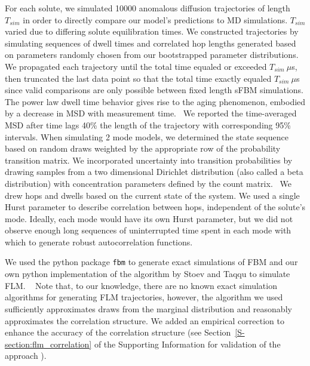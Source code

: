 \documentclass{article}
\begin{document}
  For each solute, we simulated 10000 anomalous diffusion trajectories of length $T_{sim}$ in
  order to directly compare our model's predictions to MD simulations. $T_{sim}$ varied due to
  differing solute equilibration times. We constructed trajectories by simulating 
  sequences of dwell times and correlated hop lengths generated based on
  parameters randomly chosen from our bootstrapped parameter distributions. We 
  propagated each trajectory until the total time equaled or exceeded $T_{sim}~ \mu$s, then
  truncated the last data point so that the total time exactly equaled $T_{sim}~ \mu$s since
  valid comparisons are only possible between fixed length sFBM simulations. The
  power law dwell time behavior gives rise to the aging phenomenon, embodied by a 
  decrease in MSD with measurement time.~\cite{neusius_subdiffusion_2008,metzler_anomalous_2014}
  We reported the time-averaged MSD after time lags 40\% the length of the trajectory
  with corresponding 95\% intervals.
  When simulating 2 mode models, we determined the state sequence based on random 
  draws weighted by the appropriate row of the probability transition matrix. We 
  incorporated uncertainty into transition probabilities by drawing samples from a 
  two dimensional Dirichlet distribution (also called a beta distribution) with concentration parameters defined by 
  the count matrix.~\cite{bacallado_bayesian_2009} We drew hops and dwells based on
  the current state of the system. 
  We used a single Hurst parameter to describe
  correlation between hops, independent of the solute's mode. Ideally, each mode
  would have its own Hurst parameter, but we did not observe enough long sequences
  of uninterrupted time spent in each mode with which to generate robust
  autocorrelation functions. 
  
  We used the python package \texttt{fbm} to generate exact simulations of FBM and our
  own python implementation of the algorithm by Stoev and Taqqu to simulate FLM.
  ~\cite{stoev_simulation_2004} Note that, to our knowledge, there are no known exact
  simulation algorithms for generating FLM trajectories, however, the algorithm
  we used sufficiently approximates draws from the marginal distribution and 
  reasonably 
  approximates the correlation structure. We added an empirical correction to enhance
  the accuracy of the correlation structure (see Section~\ref{S-section:flm_correlation}
  of the Supporting Information
  for validation of the approach 
  ).
  
\end{document}
